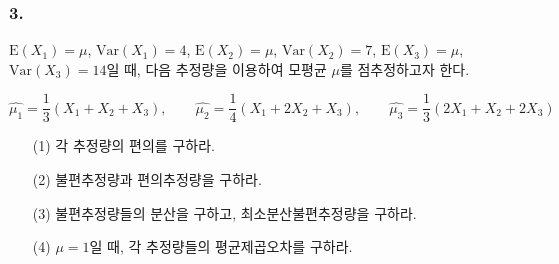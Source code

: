 \subsubsection{3.} $\mathrm{E}\left(X_1\right)=\mu$, $\mathrm{Var}\left(X_1\right)=4$,
$\mathrm{E}\left(X_2\right)=\mu$, $\mathrm{Var}\left(X_2\right)=7$,
$\mathrm{E}\left(X_3\right)=\mu$, $\mathrm{Var}\left(X_3\right)=14$일 때, 다음 추정량을 이용하여 모평균 $\mu$를 점추정하고자 한다.

\[
    \hat{\mu_1} = \frac{1}{3}\left(X_1+X_2+X_3\right),\qquad
    \hat{\mu_2} = \frac{1}{4}\left(X_1+2X_2+X_3\right),\qquad
    \hat{\mu_3} = \frac{1}{3}\left(2X_1+X_2+2X_3\right)   
\]

\begin{itemize}
    \item[(1)] 각 추정량의 편의를 구하라.
    \item[(2)] 불편추정량과 편의추정량을 구하라.
    \item[(3)] 불편추정량들의 분산을 구하고, 최소분산불편추정량을 구하라.
    \item[(4)] $\mu=1$일 때, 각 추정량들의 평균제곱오차를 구하라.   
\end{itemize}


